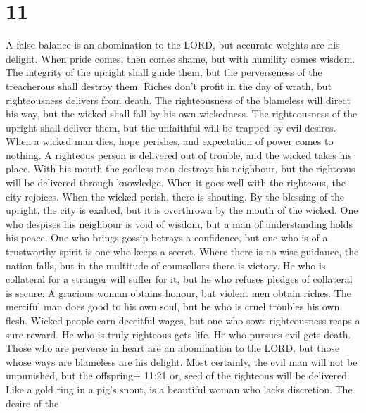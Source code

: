 \hypertarget{section-10}{%
\section{11}\label{section-10}}

 A false balance is an abomination to the LORD, but accurate
weights are his delight.  When pride comes, then comes
shame, but with humility comes wisdom.  The integrity of the
upright shall guide them, but the perverseness of the treacherous shall
destroy them.  Riches don't profit in the day of wrath, but
righteousness delivers from death.  The righteousness of the
blameless will direct his way, but the wicked shall fall by his own
wickedness.  The righteousness of the upright shall deliver
them, but the unfaithful will be trapped by evil desires. 
When a wicked man dies, hope perishes, and expectation of power comes to
nothing.  A righteous person is delivered out of trouble,
and the wicked takes his place.  With his mouth the godless
man destroys his neighbour, but the righteous will be delivered through
knowledge.  When it goes well with the righteous, the city
rejoices. When the wicked perish, there is shouting.  By
the blessing of the upright, the city is exalted, but it is overthrown
by the mouth of the wicked.  One who despises his neighbour
is void of wisdom, but a man of understanding holds his peace.
 One who brings gossip betrays a confidence, but one who is
of a trustworthy spirit is one who keeps a secret.  Where
there is no wise guidance, the nation falls, but in the multitude of
counsellors there is victory.  He who is collateral for a
stranger will suffer for it, but he who refuses pledges of collateral is
secure.  A gracious woman obtains honour, but violent men
obtain riches.  The merciful man does good to his own soul,
but he who is cruel troubles his own flesh.  Wicked people
earn deceitful wages, but one who sows righteousness reaps a sure
reward.  He who is truly righteous gets life. He who
pursues evil gets death.  Those who are perverse in heart
are an abomination to the LORD, but those whose ways are blameless are
his delight.  Most certainly, the evil man will not be
unpunished, but the offspring+ 11:21 or, seed of the righteous will be
delivered.  Like a gold ring in a pig's snout, is a
beautiful woman who lacks discretion.  The desire of the
